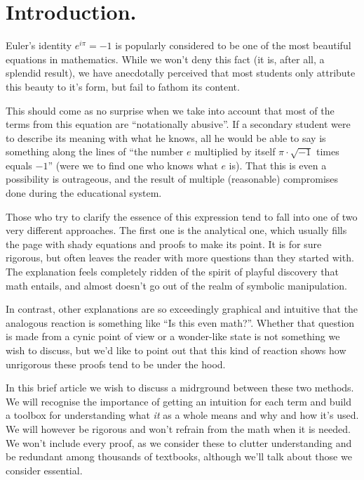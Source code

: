\section{Introduction.}

Euler's identity $e^{i\pi} = -1$ is popularly considered to be one of the most beautiful equations in mathematics. While we won't deny this fact (it is, after all, a splendid result), we have anecdotally perceived that most students only attribute this beauty to it's form, but fail to fathom its content.

This should come as no surprise when we take into account that most of the terms from this equation are \enquote{notationally abusive}. If a secondary student were to describe its meaning with what he knows, all he would be able to say is something along the lines of \enquote{the number $e$ multiplied by itself $\pi\cdot\sqrt{-1}$ times equals $-1$} (were we to find one who knows what $e$ is). That this is even a possibility is outrageous, and the result of multiple (reasonable) compromises done during the educational system.

Those who try to clarify the essence of this expression tend to fall into one of two very different approaches. The first one is the analytical one, which usually fills the page with shady equations and proofs to make its point. It is for sure rigorous, but often leaves the reader with more questions than they started with. The explanation feels completely ridden of the spirit of playful discovery that math entails, and almost doesn't go out of the realm of symbolic manipulation.

In contrast, other explanations are so exceedingly graphical and intuitive that the analogous reaction is something like \enquote{Is this even math?}. Whether that question is made from a cynic point of view or a wonder-like state is not something we wish to discuss, but we'd like to point out that this kind of reaction shows how unrigorous these proofs tend to be under the hood.

In this brief article we wish to discuss a midrground between these two methods. We will recognise the importance of getting an intuition for each term and build a toolbox for understanding what \textit{it} as a whole means and why and how it's used. We will however be rigorous and won't refrain from the math when it is needed. We won't include every proof, as we consider these to clutter understanding and be redundant among thousands of textbooks, although we'll talk about those we consider essential.

